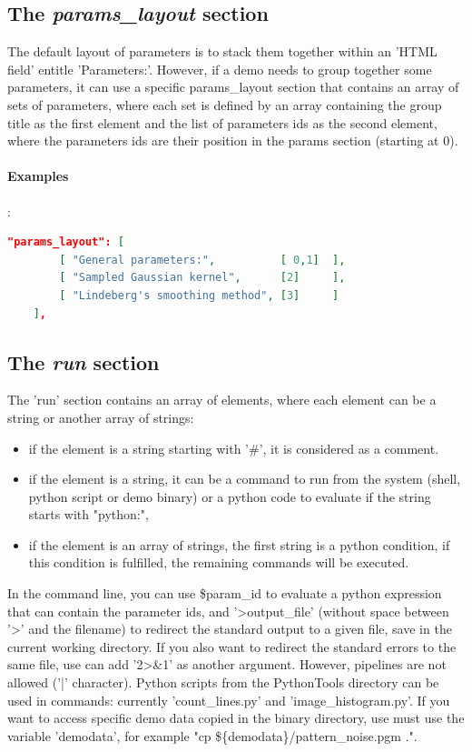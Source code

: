 \subsection{The \emph{params\_layout} section}

The default layout of parameters is to stack them together within an 'HTML field'
entitle 'Parameters:'. However, if a demo needs to group together some parameters,
it can use a specific params\_layout section that contains an array of
sets of parameters, where each set is defined by an array containing the group 
title as the first element and the list of parameters ids as the second element,
where the parameters ids are their position in the params section (starting at 0).

\paragraph{Examples}:\\
\begin{lstlisting}[language=json,firstnumber=1]
  "params_layout": [
        [ "General parameters:",          [ 0,1]  ],
        [ "Sampled Gaussian kernel",      [2]     ],
        [ "Lindeberg's smoothing method", [3]     ]
    ],
\end{lstlisting}

\subsection{The \emph{run} section}

The 'run' section contains an array of elements, where each element can be 
a string or another array of strings:
\begin{itemize}
\item if the element is a string starting with '\#', it is considered as a comment.
\item if the element is a string, it can be a command to run from the system (shell, 
python script or demo binary) or a python code to evaluate if the string
starts with "python:",
\item if the element is an array of strings, the first string is a python
condition, if this condition is fulfilled, the remaining commands will be
executed.
\end{itemize}
In the command line, you can use \$param\_id to evaluate a 
python expression that can contain the parameter ids,
and '\textgreater output\_file' (without space between '\textgreater' and the 
filename) to redirect the standard output to a given file, save in the current 
working directory. 
If you also want to redirect the standard errors to the same file, use can add 
'2\textgreater\&1' as another argument. However, pipelines are not allowed 
('|' character).
Python scripts from the PythonTools directory can be used in commands: currently
'count\_lines.py' and 'image\_histogram.py'.
If you want to access specific demo data copied in the binary directory, use must
use the variable 'demodata', for example "cp \$\{demodata\}/\-pattern\-\_noise.pgm .".


